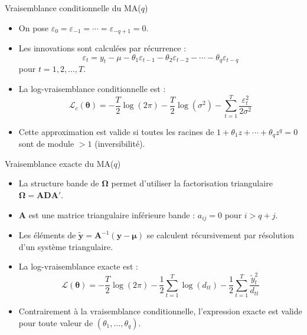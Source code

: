 \documentclass[11pt,aspectratio=169]{beamer}
\begin{document}
\begin{frame}{Vraisemblance conditionnelle du MA($q$)}

\begin{itemize}

\item On pose $\varepsilon_0 = \varepsilon_{-1} = \cdots = \varepsilon_{-q+1} = 0$.\newline

\item Les innovations sont calculées par récurrence :
  \[
  \varepsilon_t = y_t - \mu - \theta_1 \varepsilon_{t-1} - \theta_2 \varepsilon_{t-2} - \cdots - \theta_q \varepsilon_{t-q}
  \]
  pour $t = 1, 2, \ldots, T$.\newline

\item La log-vraisemblance conditionnelle est :
  \[
  \mathcal{L}_c(\bm{\theta}) = -\frac{T}{2}\log(2\pi) - \frac{T}{2}\log(\sigma^2) - \sum_{t=1}^{T}\frac{\varepsilon_t^2}{2\sigma^2}
  \]\newline

\item Cette approximation est valide si toutes les racines de $1 + \theta_1 z + \cdots + \theta_q z^q = 0$ sont de module $> 1$ (inversibilité).

\end{itemize}

\end{frame}

\begin{frame}{Vraisemblance exacte du MA($q$)}

\begin{itemize}

\item La structure bande de $\bm{\Omega}$ permet d'utiliser la factorisation triangulaire $\bm{\Omega} = \mathbf{A}\mathbf{D}\mathbf{A}'$.\newline

\item $\mathbf{A}$ est une matrice triangulaire inférieure bande : $a_{ij} = 0$ pour $i > q + j$.\newline

\item Les éléments de $\tilde{\mathbf{y}} = \mathbf{A}^{-1}(\mathbf{y} - \bm{\mu})$ se calculent récursivement par résolution d'un système triangulaire.\newline

\item La log-vraisemblance exacte est :
  \[
  \mathcal{L}(\bm{\theta}) = -\frac{T}{2}\log(2\pi) - \frac{1}{2}\sum_{t=1}^{T}\log(d_{tt}) - \frac{1}{2}\sum_{t=1}^{T}\frac{\tilde{y}_t^2}{d_{tt}}
  \]\newline

\item Contrairement à la vraisemblance conditionnelle, l'expression exacte est valide pour toute valeur de $(\theta_1, \ldots, \theta_q)$.

\end{itemize}

\end{frame}
\end{document}
